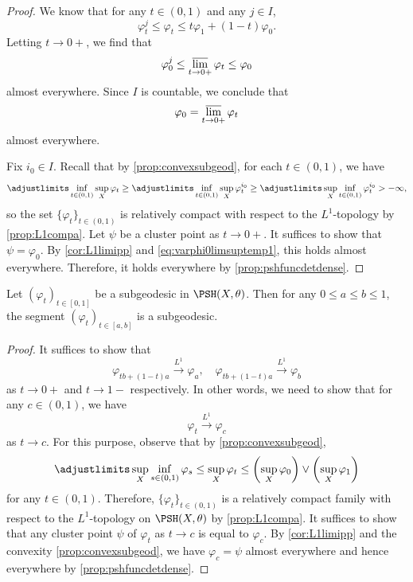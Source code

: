 \begin{proof}
    We know that for any $t\in (0,1)$ and any $j\in I$,
    \[
    \varphi^j_t\leq \varphi_t\leq t\varphi_1+(1-t)\varphi_0.
    \]
    Letting $t\to 0+$, we find that
    \[
    \varphi_0^j\leq \varlimsup_{t\to 0+}\varphi_t\leq \varphi_0
    \]
    almost everywhere. Since $I$ is countable, we conclude that
    \begin{equation}\label{eq:varphi0limsuptemp1}
    \varphi_0=\varlimsup_{t\to 0+}\varphi_t
    \end{equation}
    almost everywhere.

    Fix $i_0\in I$.
    Recall that by \cref{prop:convexsubgeod}, for each $t\in (0,1)$, we have
    \[
    \adjustlimits \inf_{t\in (0,1)}\sup_X \varphi_t\geq \adjustlimits\inf_{t\in (0,1)}\sup_X \varphi^{i_0}_t\geq \adjustlimits\sup_X \inf_{t\in (0,1)}\varphi^{i_0}_t>-\infty,
    \]
    so the set $\{\varphi_t\}_{t\in (0,1)}$ is relatively compact with respect to the $L^1$-topology by \cref{prop:L1compa}.
    Let $\psi$ be a cluster point as $t\to 0+$. It suffices to show that $\psi=\varphi_0$. By \cref{cor:L1limipp} and \eqref{eq:varphi0limsuptemp1}, this holds almost everywhere. Therefore, it holds everywhere by \cref{prop:pshfuncdetdense}.
\end{proof}

\begin{proposition}\label{prop:subgeodrestsubgeod}
    Let $(\varphi_t)_{t\in [0,1]}$ be a subgeodesic in $\PSH(X,\theta)$. Then for any $0\leq a\leq b\leq 1$, the segment $(\varphi_{t})_{t\in [a,b]}$ is a subgeodesic.
\end{proposition}



\begin{proof}
    It suffices to show that
    \[
    \varphi_{tb+(1-t)a}\xrightarrow{L^1}\varphi_a,\quad \varphi_{tb+(1-t)a}\xrightarrow{L^1}\varphi_b
    \]
    as $t\to 0+$ and $t\to 1-$ respectively. In other words, we need to show that for any $c\in (0,1)$, we have
    \[
    \varphi_t\xrightarrow{L^1}\varphi_c
    \]
    as $t\to c$. For this purpose, observe that by \cref{prop:convexsubgeod},
    \[
    \adjustlimits\sup_X \inf_{s\in (0,1)}\varphi_s\leq \sup_{X}\varphi_t\leq \left( \sup_X \varphi_0 \right) \lor \left( \sup_X\varphi_1 \right)
    \]
    for any $t\in (0,1)$. Therefore, $\{\varphi_t\}_{t\in (0,1)}$ is a relatively compact family with respect to the $L^1$-topology on $\PSH(X,\theta)$ by \cref{prop:L1compa}. It suffices to show that any cluster point $\psi$ of $\varphi_t$ as $t\to c$ is equal to $\varphi_c$.
    By \cref{cor:L1limipp} and the convexity \cref{prop:convexsubgeod}, we have $\varphi_c=\psi$ almost everywhere and hence everywhere by \cref{prop:pshfuncdetdense}.
\end{proof}

